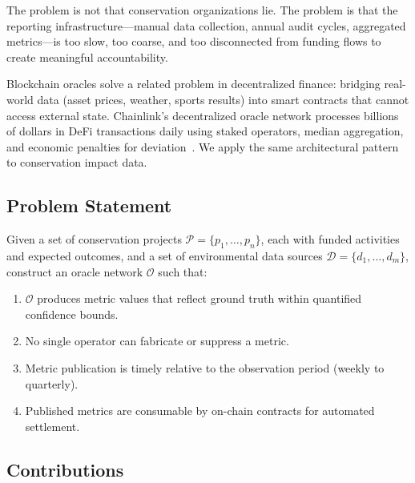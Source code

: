 \documentclass[11pt,letterpaper]{article}
\begin{document}
The problem is not that conservation organizations lie. The problem is that the reporting infrastructure---manual data collection, annual audit cycles, aggregated metrics---is too slow, too coarse, and too disconnected from funding flows to create meaningful accountability.

Blockchain oracles solve a related problem in decentralized finance: bridging real-world data (asset prices, weather, sports results) into smart contracts that cannot access external state. Chainlink's decentralized oracle network processes billions of dollars in DeFi transactions daily using staked operators, median aggregation, and economic penalties for deviation~\cite{chainlink2023}. We apply the same architectural pattern to conservation impact data.

\subsection{Problem Statement}

Given a set of conservation projects $\mathcal{P} = \{p_1, \ldots, p_n\}$, each with funded activities and expected outcomes, and a set of environmental data sources $\mathcal{D} = \{d_1, \ldots, d_m\}$, construct an oracle network $\mathcal{O}$ such that:

\begin{enumerate}
    \item $\mathcal{O}$ produces metric values that reflect ground truth within quantified confidence bounds.
    \item No single operator can fabricate or suppress a metric.
    \item Metric publication is timely relative to the observation period (weekly to quarterly).
    \item Published metrics are consumable by on-chain contracts for automated settlement.
\end{enumerate}

\subsection{Contributions}
\end{document}
